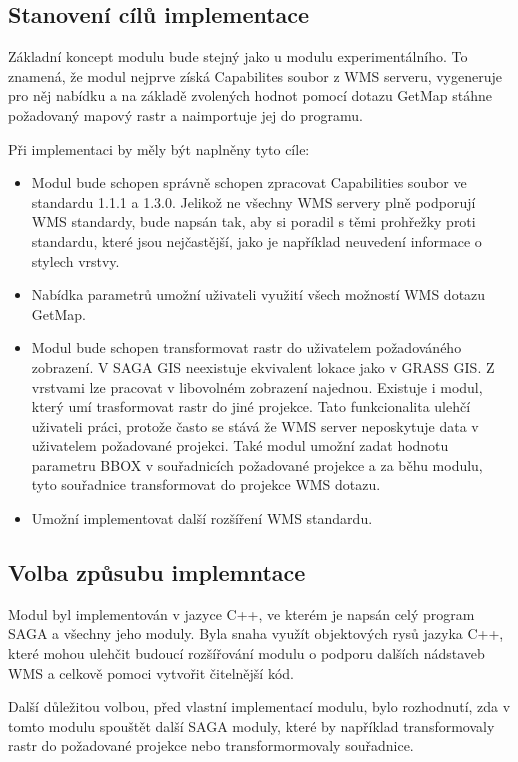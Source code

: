 \documentclass[a4paper,12pt]{article}
\begin{document}
 
\subsection{Stanovení cílů implementace}


Základní koncept modulu bude stejný jako u modulu experimentálního. To znamená, že modul nejprve získá Capabilites soubor z WMS serveru, vygeneruje pro něj nabídku a na základě zvolených hodnot pomocí 
dotazu GetMap stáhne požadovaný mapový rastr a naimportuje jej do programu. 

Při implementaci by měly být naplněny tyto cíle:
\begin{itemize}
\item  Modul bude schopen správně schopen zpracovat Capabilities soubor ve standardu 1.1.1 a 1.3.0.  Jelikož ne všechny WMS servery plně podporují WMS standardy, bude napsán tak, aby si poradil s těmi prohřežky proti standardu, které jsou nejčastější, jako je například neuvedení informace o stylech vrstvy.  
\item Nabídka parametrů umožní uživateli využití všech možností WMS dotazu GetMap.
\item Modul bude schopen transformovat rastr do uživatelem požadováného zobrazení. V SAGA GIS neexistuje ekvivalent lokace jako v GRASS GIS. Z vrstvami lze pracovat v libovolném zobrazení najednou. Existuje i modul,
      který umí trasformovat rastr do jiné projekce. Tato funkcionalita ulehčí uživateli práci, protože často se stává že WMS server neposkytuje data v uživatelem požadované projekci. 
Také modul umožní zadat hodnotu parametru BBOX v souřadnicích požadované projekce a za běhu modulu, tyto souřadnice transformovat do projekce WMS dotazu.
\item Umožní implementovat další rozšíření WMS standardu. 
\end{itemize}


\subsection{Volba způsubu implemntace}

Modul byl implementován v jazyce C++, ve kterém je napsán celý program SAGA a všechny jeho moduly.  Byla snaha využít objektových rysů jazyka C++, které mohou ulehčit budoucí rozšířování 
modulu o podporu dalších nádstaveb WMS a celkově pomoci vytvořit čitelnější kód. 

Další důležitou volbou, před vlastní implementací modulu, bylo rozhodnutí, zda v tomto modulu spouštět další SAGA moduly, které  by například transformovaly rastr do požadované projekce nebo transformormovaly souřadnice. 
\end{document}
